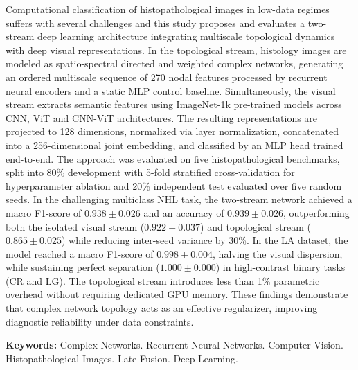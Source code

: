 \documentclass[
  12pt,		
  a4paper,	
  openright,  
  oneside,	
  chapter=TITLE,		
  section=TITLE,		
  english,	
  french,	    
  spanish,	
  brazil	    
]{abntex2}
\begin{document}
    \begin{resumo}[Abstract]
        Computational classification of histopathological images in low-data regimes suffers with several challenges and this study proposes and evaluates a two-stream deep learning architecture integrating multiscale topological dynamics with deep visual representations. In the topological stream, histology images are modeled as spatio-spectral directed and weighted complex networks, generating an ordered multiscale sequence of 270 nodal features processed by recurrent neural encoders and a static MLP control baseline. Simultaneously, the visual stream extracts semantic features using ImageNet-1k pre-trained models across CNN, ViT and CNN-ViT architectures. The resulting representations are projected to 128 dimensions, normalized via layer normalization, concatenated into a 256-dimensional joint embedding, and classified by an MLP head trained end-to-end. The approach was evaluated on five histopathological benchmarks, split into 80\% development with 5-fold stratified cross-validation for hyperparameter ablation and 20\% independent test evaluated over five random seeds. In the challenging multiclass NHL task, the two-stream network achieved a macro F1-score of $0.938 \pm 0.026$ and an accuracy of $0.939 \pm 0.026$, outperforming both the isolated visual stream ($0.922 \pm 0.037$) and topological stream ($0.865 \pm 0.025$) while reducing inter-seed variance by 30\%. In the LA dataset, the model reached a macro F1-score of $0.998 \pm 0.004$, halving the visual dispersion, while sustaining perfect separation ($1.000 \pm 0.000$) in high-contrast binary tasks (CR and LG). The topological stream introduces less than 1\% parametric overhead without requiring dedicated GPU memory. These findings demonstrate that complex network topology acts as an effective regularizer, improving diagnostic reliability under data constraints.
        
        \vspace{\onelineskip}
        \noindent\textbf{Keywords:} Complex Networks. Recurrent Neural Networks. Computer Vision. Histopathological Images. Late Fusion. Deep Learning.
    \end{resumo}
    
    \listoffigures*
    \newpage
    
    \listoftables*
    \newpage
    
\end{document}
